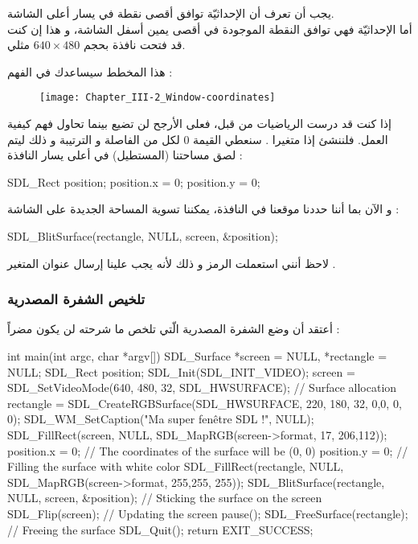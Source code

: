 يجب أن تعرف أن الإحداثيّة
توافق أقصى نقطة في يسار أعلى الشاشة.\\
أما الإحداثيّة 
فهي توافق النقطة الموجودة في أقصى يمين أسفل الشاشة، و هذا إن كنت قد فتحت نافذة بحجم
$640 \times 480$
مثلي.

هذا المخطط سيساعدك في الفهم  :

\begin{figure}[H]
	\centering
	\texttt{[image: Chapter\_III-2\_Window-coordinates]}
\end{figure}

إذا كنت قد درست الرياضيات من قبل، فعلى الأرجح لن تضيع بينما تحاول  فهم كيفية العمل. فلننشئ إذا متغيرا 
.
سنعطي القيمة 0 لكل من الفاصلة و الترتيبة و ذلك ليتم لصق مساحتنا (المستطيل) في أعلى يسار النافذة :

\begin{Csource}
SDL_Rect position;
position.x = 0;
position.y = 0;
\end{Csource}

و الآن بما أننا حددنا موقعنا في النافذة، يمكننا تسوية المساحة الجديدة على الشاشة :

\begin{Csource}
SDL_BlitSurface(rectangle, NULL, screen, &position);
\end{Csource}
 
لاحظ أنني استعملت الرمز
\InlineCode{\&}
و ذلك لأنه يجب علينا إرسال عنوان المتغير
.

\subsubsection{تلخيص الشفرة المصدرية}

أعتقد أن وضع الشفرة المصدرية الّتي تلخص ما شرحته لن يكون مضراً :

\begin{Csource}
int main(int argc, char *argv[])
{
	SDL_Surface *screen = NULL, *rectangle = NULL;
	SDL_Rect position;
	SDL_Init(SDL_INIT_VIDEO);
	screen = SDL_SetVideoMode(640, 480, 32, SDL_HWSURFACE);
	// Surface allocation
	rectangle = SDL_CreateRGBSurface(SDL_HWSURFACE, 220, 180, 32, 0,0, 0, 0);
	SDL_WM_SetCaption("Ma super fenêtre SDL !", NULL);
	SDL_FillRect(screen, NULL, SDL_MapRGB(screen->format, 17, 206,112));
	position.x = 0; // The coordinates of the surface will be (0, 0)
	position.y = 0;
	// Filling the surface with white color
	SDL_FillRect(rectangle, NULL, SDL_MapRGB(screen->format, 255,255, 255));
	SDL_BlitSurface(rectangle, NULL, screen, &position); // Sticking the surface on the screen 
	SDL_Flip(screen); // Updating the screen
	pause();
	SDL_FreeSurface(rectangle); // Freeing the surface
	SDL_Quit();
	return EXIT_SUCCESS;
}
\end{Csource}


